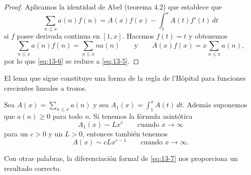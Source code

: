 \documentclass[12pt,a4paper]{book}
\begin{document}
    \begin{proof}
        Aplicamos la identidad de Abel (teorema 4.2) que establece que
        \begin{equation}\label{eq:13-6}
            \sum_{n\leq x}a(n)f(n)=A(x)f(x)-\int_{1}^{x}A(t)f'(t)\,dt
        \end{equation}
        si $f$ posee derivada continua en $[1,x]$. Hacemos $f(t)=t$ y obtenemos
        \begin{equation*}
            \sum_{n\leq x}a(n)f(n)=\sum_{n\leq x}na(n)\qquad\text{y}\qquad A(x)f(x)=x\sum_{n\leq x}a(n),
        \end{equation*}
        por lo que \eqref{eq:13-6} se reduce a \eqref{eq:13-5}.
    \end{proof}

    El lema que sigue constituye una forma de la regla de l'Hôpital para funciones crecientes
    lineales a trozos.

    \begin{lema}\label{lem:13-2}
        Sea $A(x)=\sum_{n\leq x}a(n)$ y sea $A_{1}(x)=\int_{1}^{x}A(t)\,dt$. Además suponemos que
        $a(n)\geq0$ para todo $n$. Si tenemos la fórmula asintótica
        \begin{equation}\label{eq:13-7}
            A_{1}(x)\sim Lx^{c}\qquad\text{cuando }x\to\infty
        \end{equation}
        para un $c>0$ y un $L>0$, entonces también tenemos
        \begin{equation}\label{eq:13-8}
            A(x)\sim cLx^{c-1}\qquad\text{cuando }x\to\infty.
        \end{equation}
    \end{lema}

    Con otras palabras, la diferenciación formal de \eqref{eq:13-7} nos proporciona un
    resultado correcto.
\end{document}
